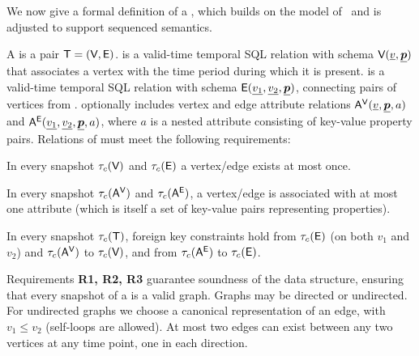We now give a formal definition of a \tg, which builds on the model
of~\cite{PortalarXiv2016} and is adjusted to support sequenced
semantics.

\begin{definition}[TGraph]
A \tg is a pair $\mathsf{T}=(\textsf{V}, \textsf{E})$. \tv is a valid-time temporal SQL
relation with schema $\textsf{V}(\underline{v}, \underline{\boldsymbol{p}})$ that
associates a vertex with the time period during which it is
present. \te is a valid-time temporal SQL relation with schema
$\textsf{E}(\underline{v_1}, \underline{v_2}, \underline{\boldsymbol{p}})$, connecting
pairs of vertices from \tv.  
%
\tve optionally includes vertex and edge attribute relations
$\mathsf{A^{V}}(\underline{v}, \underline{\boldsymbol{p}}, a)$ and $\mathsf{A^{E}}(\underline{v_1},
\underline{v_2}, \underline{\boldsymbol{p}}, a)$, where $a$ is a nested attribute
consisting of key-value property pairs.
%
Relations of \tve must meet the following requirements:

\begin{description}[noitemsep]
\item [R1: Unique vertices/edges] In every snapshot $\tau_c (\textsf{V})$
  and $\tau_c (\textsf{E})$ a vertex/edge exists at most once.
\item [R2: Unique attribute values] In every snapshot $\tau_c
  (\mathsf{A^{V}})$ and $\tau_c (\mathsf{A^{E}})$, a vertex/edge is associated with at
  most one attribute (which is itself a set of key-value pairs
  representing properties).
\item [R3: Referential integrity] In every snapshot $\tau_c (\mathsf{T})$,
  foreign key constraints hold from $\tau_c (\textsf{E})$ (on both $v_1$
  and $v_2$) and $\tau_c (\mathsf{A^{V}})$ to $\tau_c (\textsf{V})$, and from
  $\tau_c (\mathsf{A^{E}})$ to $\tau_c (\textsf{E})$.
\end{description}
\label{def:tg}
\vspace{-0.2cm}
\end{definition}

Requirements {\bf R1, R2, R3} guarantee soundness of the \tg data
structure, ensuring that every snapshot of a \tg is a valid
graph. Graphs may be directed or undirected.  For undirected graphs we
choose a canonical representation of an edge, with $v_1 \leq v_2$
(self-loops are allowed). At most
two edges can exist between any two vertices at any time point, one in
each direction.

